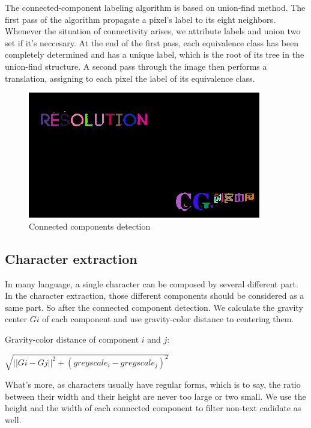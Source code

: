 \documentclass[paper=a4, french, 11pt]{scrartcl}
\begin{document}
The connected-component labeling algorithm is based on union-find method. The first pass of the algorithm propagate a pixel's label to its eight neighbors. Whenever the situation of connectivity arises, we attribute labels and union two set if it's neccesary. At the end of the first pass, each equivalence class has been completely determined and has a unique label, which is the root of its tree in the union-find structure. A second pass through the image then performs a translation, assigning to each pixel the label of its equivalence class.

\begin{figure}[h]
\begin{center}
   \includegraphics[width=0.6\linewidth]{connected_components_example.png}
\end{center}
\vspace{-4ex}
\caption{Connected components detection}
\label{fig:heatmap}
\end{figure}

\subsection{Character extraction} \mbox{} \vspace{-0.5cm}

In many language, a single character can be composed by several different part. In the character extraction, those different components should be considered as a same part. So after the connected component detection. We calculate the gravity center $G{i}$ of each component and use gravity-color distance to centering them.

Gravity-color distance of component $ i$ and $ j$:

$\sqrt{||G{i}-G{j}||^2 + (greyscale_{i} - greyscale_{j})^2}$

What's more, as characters usually have regular forms, which is to say, the ratio between their width and their height are never too large or two small. We use the height and the width of each connected component to filter non-text cadidate as well. 
\end{document}
